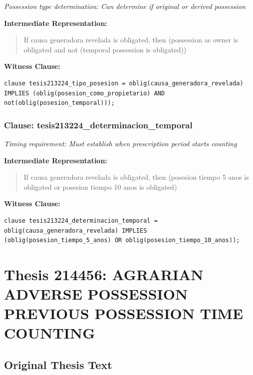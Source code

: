 \documentclass[11pt,a4paper]{article}
\begin{document}
\textit{Possession type determination: Can determine if original or derived possession}

\textbf{Intermediate Representation:}

\begin{quote}
If causa generadora revelada is obligated, then (possession as owner is obligated and not (temporal possession is obligated))
\end{quote}

\textbf{Witness Clause:}

\begin{lstlisting}[style=witnessstyle, language=Witness]
clause tesis213224_tipo_posesion = oblig(causa_generadora_revelada) IMPLIES (oblig(posesion_como_propietario) AND not(oblig(posesion_temporal)));
\end{lstlisting}

\subsubsection{Clause: tesis213224\_determinacion\_temporal}

\textit{Timing requirement: Must establish when prescription period starts counting}

\textbf{Intermediate Representation:}

\begin{quote}
If causa generadora revelada is obligated, then (posesion tiempo 5 anos is obligated or posesion tiempo 10 anos is obligated)
\end{quote}

\textbf{Witness Clause:}

\begin{lstlisting}[style=witnessstyle, language=Witness]
clause tesis213224_determinacion_temporal = oblig(causa_generadora_revelada) IMPLIES (oblig(posesion_tiempo_5_anos) OR oblig(posesion_tiempo_10_anos));
\end{lstlisting}

\newpage

\section{Thesis 214456: AGRARIAN ADVERSE POSSESSION PREVIOUS POSSESSION TIME COUNTING}
\label{thesis:214456}

\subsection{Original Thesis Text}
\end{document}
